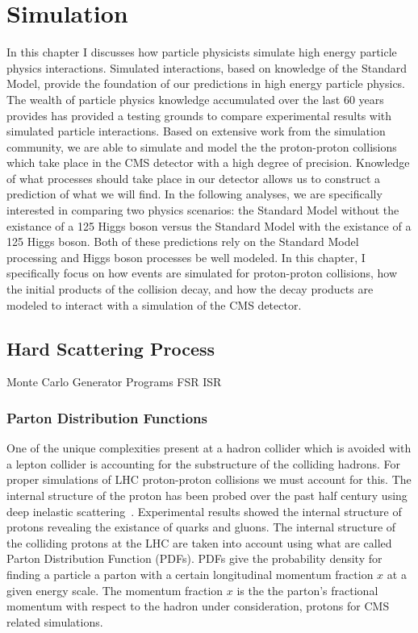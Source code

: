 \chapter{Simulation}
\label{sec:simulation}
In this chapter I discusses how particle physicists simulate high energy particle physics
interactions. Simulated interactions, based on knowledge of the Standard Model, provide 
the foundation of our predictions in high energy particle physics. 
The wealth of particle physics knowledge accumulated over the last 
60 years provides has provided a testing grounds to compare experimental results with
simulated particle interactions. Based on extensive work from the simulation community,
we are able to simulate and model the the proton-proton collisions which take place in the
CMS detector with a high degree of precision. Knowledge of what processes should take place
in our detector allows us to construct a prediction of what we will find. In the following
analyses, we are specifically interested in comparing two physics scenarios: the Standard Model 
without the existance of a 125 \GeV Higgs boson versus the Standard Model with the existance
of a 125 \GeV Higgs boson. Both of these predictions rely on the Standard Model processing and
Higgs boson processes be well modeled.
In this chapter, I specifically focus on how events are simulated for proton-proton collisions,
how the initial products of the collision decay, and how the decay products are modeled
to interact with a simulation of the CMS detector.


\section{Hard Scattering Process}
Monte Carlo Generator Programs
FSR ISR

\subsection{Parton Distribution Functions}
One of the unique complexities present at a hadron collider which is avoided with a
lepton collider is accounting for the substructure of the colliding hadrons. For proper simulations
of LHC proton-proton collisions we must account for this. The internal structure of the proton
has been probed over the past half century using deep inelastic scattering~\cite{Breidenbach:1969kd, PhysRevLett.23.930}.
Experimental results showed the internal structure of protons revealing the existance of
quarks and gluons. The internal structure of the colliding protons at the LHC are taken into
account using what are called Parton Distribution Function (PDFs). PDFs give the probability
density for finding a particle a parton with a certain longitudinal momentum fraction $x$ at a given
energy scale. The momentum fraction $x$ is the the parton's fractional momentum with respect
to the hadron under consideration, protons for CMS related simulations. 

